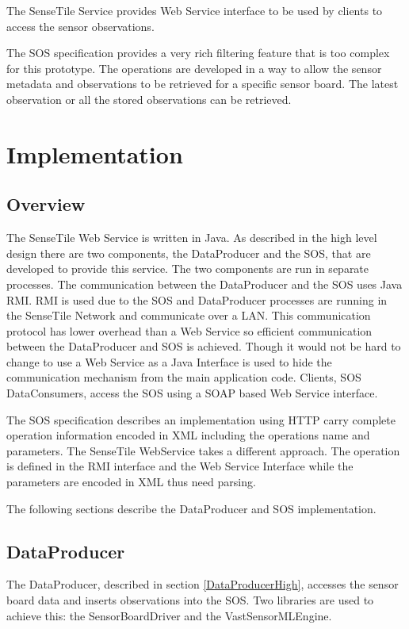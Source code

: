 \documentclass[]{final_report}
\begin{document}
The SenseTile Service provides Web Service interface to be used by clients to access the sensor observations.

The SOS specification provides a very rich filtering feature that is too complex for this prototype. The operations are developed in a way to allow the sensor metadata and observations to be retrieved for a specific sensor board. The latest observation or all the stored observations can be retrieved.

\chapter{Implementation}
\section{Overview}
The SenseTile Web Service is written in Java. As described in the high level design there are two components, the DataProducer and the SOS, that are developed to provide this service. The two components are run in separate processes. The communication between the DataProducer and the SOS uses Java RMI. RMI is used due to the SOS and DataProducer
processes are running in the SenseTile Network and communicate over a LAN. This communication protocol has lower overhead than a Web Service so efficient communication between the DataProducer and SOS is achieved. Though it would not be hard to change to use a Web Service as a Java Interface is used to hide the communication mechanism from the main application code. Clients, SOS DataConsumers, access the SOS using a SOAP based Web Service interface. 

The SOS specification describes an implementation using HTTP carry complete operation information encoded in XML including the operations name and parameters. The SenseTile WebService takes a different approach. The operation is defined in the RMI interface and the Web Service Interface while the parameters are encoded in XML thus need parsing.

The following sections describe the DataProducer and SOS implementation.
\section{DataProducer}
The DataProducer, described in section \ref{DataProducerHigh}, accesses the sensor board data and inserts observations into the SOS. Two libraries are used to achieve this: the SensorBoardDriver and the VastSensorMLEngine.
\end{document}
